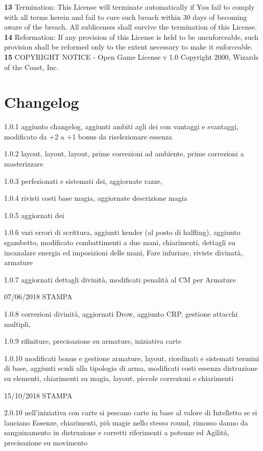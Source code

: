 \documentclass[a4paper,11pt,twoside,openany]{book}
\begin{document}
{{\textbf{13} Termination: This License will terminate automatically if You fail to comply with all terms herein and fail to cure such breach within 30 days of becoming aware of the breach. All sublicenses shall survive the termination of this License.
\textbf{14} Reformation: If any provision of this License is held to be unenforceable, such provision shall be reformed only to the extent necessary to make it enforceable.
\textbf{15} COPYRIGHT NOTICE - Open Game License v 1.0 Copyright 2000, Wizards of the Coast, Inc. }

\normalsize

\pagebreak

{\footnotesize 
\section{Changelog}

1.0.1 aggiunto changelog, aggiunti ambiti agli dei con vantaggi e svantaggi, modificato da +2 a +1 bonus da riselezionare essenza

1.0.2 layout, layout, layout, prime correzioni ad ambiente, prime correzioni a masterizzare

1.0.3 perfezionati e sistemati dei, aggiornate razze,

1.0.4 rivisti costi base magia, aggiornate descrizione magia

1.0.5 aggiornati dei

1.0.6 vari errori di scrittura, aggiunti kender (al posto di halfling), aggiunto sgambetto, modificato combattimenti a due mani, chiarimenti, dettagli su incanalare energia ed imposizioni delle mani, Fare infuriare, riviste divinatà, armature 

1.0.7 aggiornati dettagli divinità, modificati penalità al CM per Armature

07/06/2018 STAMPA

1.0.8 correzioni divinità, aggiornati Drow, aggiunto CRP, gestione attacchi multipli,

1.0.9 rifiniture, precisazione su armature, iniziativa carte 

1.0.10 modificati bonus e gestione armature, layout, riordinati e sistemati termini di base, aggiunti scudi alla tipologia di arma, modificati costi essenza distruzione su elementi, chiarimenti su magia, layout, piccole correzioni e chiarimenti

15/10/2018 STAMPA

2.0.10 nell'iniziativa con carte si pescano carte in base al valore di Intelletto se si lanciano Essenze, chiarimenti, più magie nello stesso round, rimosso danno da sanguinamento in distruzione e corretti riferimenti a potenze ed Agilità, precisazione su movimento

}}
\end{document}
